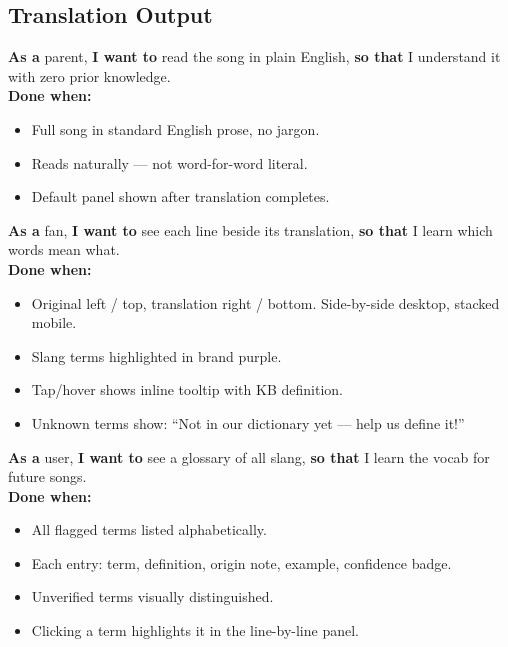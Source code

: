 \documentclass[12pt, a4paper]{article}
\begin{document}
\subsection{Translation Output}

\begin{tcolorbox}[storybox, title={US-07 — View Plain Translation}]
  \textbf{As a} parent, \textbf{I want to} read the song in plain English,
  \textbf{so that} I understand it with zero prior knowledge.\\[0.4em]
  \textbf{Done when:}
  \begin{itemize}
    \item Full song in standard English prose, no jargon.
    \item Reads naturally — not word-for-word literal.
    \item Default panel shown after translation completes.
  \end{itemize}
\end{tcolorbox}

\begin{tcolorbox}[storybox, title={US-08 — View Line-by-Line Breakdown}]
  \textbf{As a} fan, \textbf{I want to} see each line beside its translation,
  \textbf{so that} I learn which words mean what.\\[0.4em]
  \textbf{Done when:}
  \begin{itemize}
    \item Original left / top, translation right / bottom. Side-by-side desktop,
          stacked mobile.
    \item Slang terms highlighted in brand purple.
    \item Tap/hover shows inline tooltip with KB definition.
    \item Unknown terms show: ``Not in our dictionary yet — help us define it!''
  \end{itemize}
\end{tcolorbox}

\begin{tcolorbox}[storybox, title={US-09 — View Slang Dictionary}]
  \textbf{As a} user, \textbf{I want to} see a glossary of all slang,
  \textbf{so that} I learn the vocab for future songs.\\[0.4em]
  \textbf{Done when:}
  \begin{itemize}
    \item All flagged terms listed alphabetically.
    \item Each entry: term, definition, origin note, example, confidence badge.
    \item Unverified terms visually distinguished.
    \item Clicking a term highlights it in the line-by-line panel.
  \end{itemize}
\end{tcolorbox}
\end{document}

